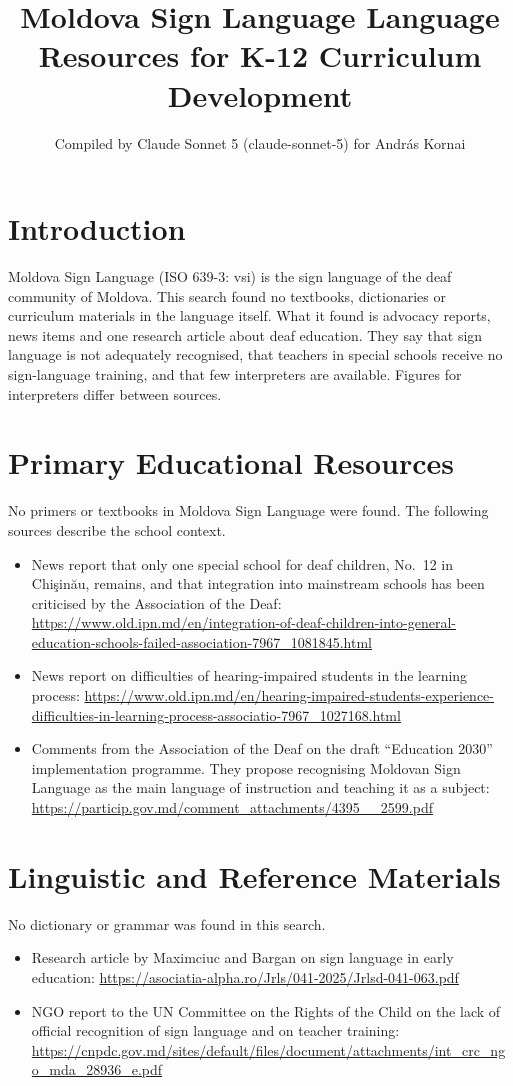 \documentclass[12pt]{article}
\title{Moldova Sign Language Language Resources for K-12 Curriculum Development}
\author{Compiled by Claude Sonnet 5 (claude-sonnet-5) for Andr\'as Kornai}
\date{}
\begin{document}
\maketitle

\section{Introduction}
Moldova Sign Language (ISO 639-3: vsi) is the sign language of the deaf community of Moldova. This search found no textbooks, dictionaries or curriculum materials in the language itself. What it found is advocacy reports, news items and one research article about deaf education. They say that sign language is not adequately recognised, that teachers in special schools receive no sign-language training, and that few interpreters are available. Figures for interpreters differ between sources.

\section{Primary Educational Resources}
No primers or textbooks in Moldova Sign Language were found. The following sources describe the school context.
\begin{itemize}
\item News report that only one special school for deaf children, No.\ 12 in Chi\c{s}in\u{a}u, remains, and that integration into mainstream schools has been criticised by the Association of the Deaf: \url{https://www.old.ipn.md/en/integration-of-deaf-children-into-general-education-schools-failed-association-7967_1081845.html}
\item News report on difficulties of hearing-impaired students in the learning process: \url{https://www.old.ipn.md/en/hearing-impaired-students-experience-difficulties-in-learning-process-associatio-7967_1027168.html}
\item Comments from the Association of the Deaf on the draft ``Education 2030'' implementation programme. They propose recognising Moldovan Sign Language as the main language of instruction and teaching it as a subject: \url{https://particip.gov.md/comment_attachments/4395__2599.pdf}
\end{itemize}

\section{Linguistic and Reference Materials}
No dictionary or grammar was found in this search.
\begin{itemize}
\item Research article by Maximciuc and Bargan on sign language in early education: \url{https://asociatia-alpha.ro/Jrls/041-2025/Jrlsd-041-063.pdf}
\item NGO report to the UN Committee on the Rights of the Child on the lack of official recognition of sign language and on teacher training: \url{https://cnpdc.gov.md/sites/default/files/document/attachments/int_crc_ngo_mda_28936_e.pdf}
\end{itemize}
\end{document}
